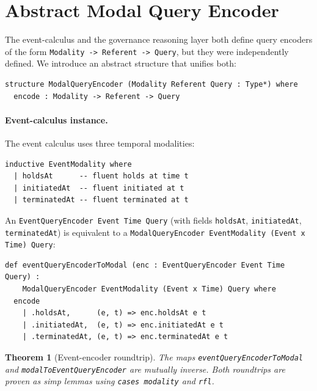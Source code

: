 \documentclass[]{article}
\newtheorem{theorem}{Theorem}
\newcommand{\code}[1]{\texttt{#1}}
\begin{document}
\section{Abstract Modal Query Encoder}
\label{sec:mqe}

The event-calculus \cite{KowalskiSergot1986,Shanahan1999} and the governance
reasoning layer both define query encoders of the form
\code{Modality -> Referent -> Query}, but they were independently defined.
We introduce an abstract structure that unifies both:

\begin{lstlisting}
structure ModalQueryEncoder (Modality Referent Query : Type*) where
  encode : Modality -> Referent -> Query
\end{lstlisting}

\paragraph{Event-calculus instance.}
The event calculus uses three temporal modalities:

\begin{lstlisting}
inductive EventModality where
  | holdsAt      -- fluent holds at time t
  | initiatedAt  -- fluent initiated at t
  | terminatedAt -- fluent terminated at t
\end{lstlisting}

\noindent
An \code{EventQueryEncoder Event Time Query} (with fields \code{holdsAt},
\code{initiatedAt}, \code{terminatedAt}) is equivalent to a
\code{ModalQueryEncoder EventModality (Event x Time) Query}:

\begin{lstlisting}
def eventQueryEncoderToModal (enc : EventQueryEncoder Event Time Query) :
    ModalQueryEncoder EventModality (Event x Time) Query where
  encode
    | .holdsAt,      (e, t) => enc.holdsAt e t
    | .initiatedAt,  (e, t) => enc.initiatedAt e t
    | .terminatedAt, (e, t) => enc.terminatedAt e t
\end{lstlisting}

\begin{theorem}[Event-encoder roundtrip]
The maps \code{eventQueryEncoderToModal} and \code{modalToEventQueryEncoder}
are mutually inverse.
Both roundtrips are proven as simp lemmas using \code{cases modality} and \code{rfl}.
\end{theorem}
\end{document}
